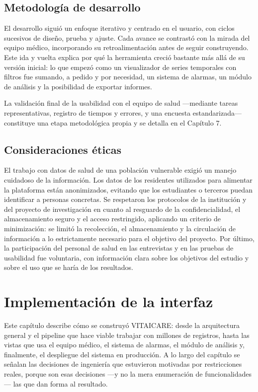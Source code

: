 \documentclass[12pt,a4paper]{article}
\begin{document}
    \subsection{Metodología de desarrollo}
    El desarrollo siguió un enfoque iterativo y centrado en el usuario, con ciclos sucesivos de diseño, prueba y ajuste. Cada avance se contrastó con la mirada del equipo médico, incorporando su retroalimentación antes de seguir construyendo. Este ida y vuelta explica por qué la herramienta creció bastante más allá de su versión inicial: lo que empezó como un visualizador de series temporales con filtros fue sumando, a pedido y por necesidad, un sistema de alarmas, un módulo de análisis y la posibilidad de exportar informes.

    La validación final de la usabilidad con el equipo de salud —mediante tareas representativas, registro de tiempos y errores, y una encuesta estandarizada— constituye una etapa metodológica propia y se detalla en el Capítulo 7.

    \subsection{Consideraciones éticas}
    El trabajo con datos de salud de una población vulnerable exigió un manejo cuidadoso de la información. Los datos de los residentes utilizados para alimentar la plataforma están anonimizados, evitando que los estudiantes o terceros puedan identificar a personas concretas. Se respetaron los protocolos de la institución y del proyecto de investigación en cuanto al resguardo de la confidencialidad, el almacenamiento seguro y el acceso restringido, aplicando un criterio de minimización: se limitó la recolección, el almacenamiento y la circulación de información a lo estrictamente necesario para el objetivo del proyecto. Por último, la participación del personal de salud en las entrevistas y en las pruebas de usabilidad fue voluntaria, con información clara sobre los objetivos del estudio y sobre el uso que se haría de los resultados.
\newpage

\section{Implementación de la interfaz}

    Este capítulo describe cómo se construyó VITAICARE: desde la arquitectura general y el pipeline que hace viable trabajar con millones de registros, hasta las vistas que usa el equipo médico, el sistema de alarmas, el módulo de análisis y, finalmente, el despliegue del sistema en producción. A lo largo del capítulo se señalan las decisiones de ingeniería que estuvieron motivadas por restricciones reales, porque son esas decisiones —y no la mera enumeración de funcionalidades— las que dan forma al resultado.
\end{document}
